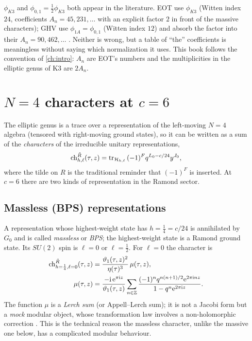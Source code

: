 \begin{pitfallbox}
$\phi_{K3}$ and $\phi_{0,1}=\tfrac12\phi_{K3}$ both appear in the literature. EOT use
$\phi_{K3}$ (Witten index $24$, coefficients $A_n=45,231,\dots$ with an explicit factor $2$ in
front of the massive characters); GHV use $\phi_{1A}=\phi_{0,1}$ (Witten index $12$) and
absorb the factor into their $A_n=90,462,\dots$ . Neither is
wrong, but a table of ``the'' coefficients is meaningless without saying which normalization
it uses. This book follows the convention of \cref{ch:intro}: $A_n$ are EOT's numbers and the
multiplicities in the elliptic genus of K3 are $2A_n$.
\end{pitfallbox}

\section{\texorpdfstring{$N=4$}{N = 4} characters at \texorpdfstring{$c=6$}{c = 6}}\label{sec:ellgenus:chars}

The elliptic genus is a trace over a representation of the left-moving $N=4$ algebra
(tensored with right-moving ground states), so it can be written as a sum of the
\emph{characters} of the irreducible unitary representations,
\begin{equation}\label{eq:ellgenus:chardef}
 \mathrm{ch}^{\tilde R}_{h,\ell}(\tau,z)=\operatorname{tr}_{\mathcal H_{h,\ell}}\,(-1)^F q^{L_0-c/24}y^{J_0},
\end{equation}
where the tilde on $R$ is the traditional reminder that $(-1)^F$ is inserted. At $c=6$
there are two kinds of representation in the Ramond sector.

\subsection{Massless (BPS) representations}

A representation whose highest-weight state has $h=\tfrac14=c/24$ is annihilated by $G_0$
and is called \emph{massless} or \emph{BPS}; the highest-weight state is a Ramond ground
state. Its $SU(2)$ spin is $\ell=0$ or $\ell=\tfrac12$. For $\ell=0$ the character is
\begin{align}
 \mathrm{ch}^{\tilde R}_{h=\frac14,\ell=0}(\tau,z)
   &=\frac{\vartheta_1(\tau,z)^2}{\eta(\tau)^3}\,\mu(\tau,z),\label{eq:ellgenus:ch0}\\
 \mu(\tau,z)&=\frac{-\mathrm{i}\,\mathrm{e}^{\pi\mathrm{i} z}}{\vartheta_1(\tau,z)}
   \sum_{n\in\mathbb{Z}}\frac{(-1)^n q^{n(n+1)/2}\mathrm{e}^{2\pi\mathrm{i} nz}}{1-q^n\mathrm{e}^{2\pi\mathrm{i} z}}.
   \label{eq:ellgenus:mu}
\end{align}
The function $\mu$ is a \emph{Lerch sum} (or Appell--Lerch sum); it is not a Jacobi form
but a \emph{mock} modular object, whose transformation law involves a non-holomorphic
correction . This is the technical reason the massless
character, unlike the massive one below, has a complicated modular behaviour.

